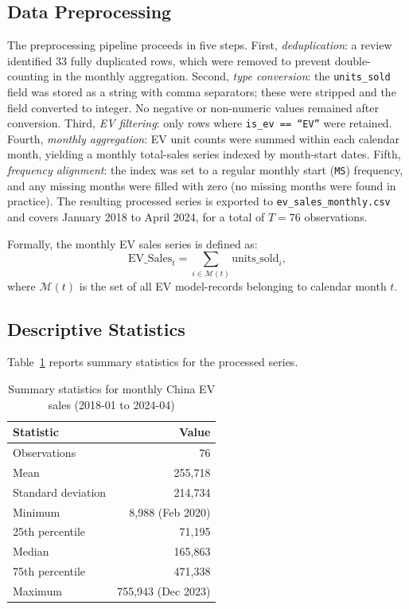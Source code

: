 \documentclass[12pt]{article}
\begin{document}
\subsection{Data Preprocessing}

The preprocessing pipeline proceeds in five steps. First, \textit{deduplication}: a review identified 33 fully duplicated rows, which were removed to prevent double-counting in the monthly aggregation. Second, \textit{type conversion}: the \texttt{units\_sold} field was stored as a string with comma separators; these were stripped and the field converted to integer. No negative or non-numeric values remained after conversion. Third, \textit{EV filtering}: only rows where \texttt{is\_ev == ``EV''} were retained. Fourth, \textit{monthly aggregation}: EV unit counts were summed within each calendar month, yielding a monthly total-sales series indexed by month-start dates. Fifth, \textit{frequency alignment}: the index was set to a regular monthly start (\texttt{MS}) frequency, and any missing months were filled with zero (no missing months were found in practice). The resulting processed series is exported to \texttt{ev\_sales\_monthly.csv} and covers January 2018 to April 2024, for a total of $T = 76$ observations.

Formally, the monthly EV sales series is defined as:
\begin{equation}
\text{EV\_Sales}_{t} = \sum_{i \in \mathcal{M}(t)} \text{units\_sold}_{i},
\end{equation}
where $\mathcal{M}(t)$ is the set of all EV model-records belonging to calendar month $t$.

\subsection{Descriptive Statistics}

Table~\ref{tab:desc} reports summary statistics for the processed series.

\begin{table}[H]
\centering
\caption{Summary statistics for monthly China EV sales (2018-01 to 2024-04)}
\label{tab:desc}
\begin{tabular}{lr}
\toprule
Statistic & Value \\
\midrule
Observations & 76 \\
Mean & 255,718 \\
Standard deviation & 214,734 \\
Minimum & 8,988 (Feb 2020) \\
25th percentile & 71,195 \\
Median & 165,863 \\
75th percentile & 471,338 \\
Maximum & 755,943 (Dec 2023) \\
\bottomrule
\end{tabular}
\end{table}
\end{document}
